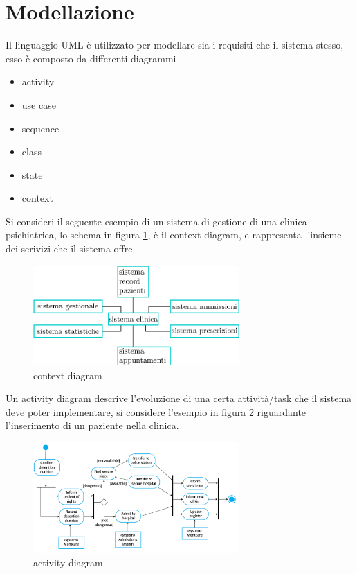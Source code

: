 \documentclass[10pt, letterpaper]{report}
\begin{document}
\section{Modellazione}
Il linguaggio UML è utilizzato per modellare sia i requisiti che il sistema stesso, 
esso è composto da differenti diagrammi\begin{itemize}
    \item activity 
    \item use case 
    \item sequence 
    \item class 
    \item state 
    \item context
\end{itemize}
Si consideri il seguente esempio di un sistema di gestione di una clinica psichiatrica, 
lo schema in figura \ref{clinica}, è il context diagram, e rappresenta l'insieme dei serivizi che il 
sistema offre.
\begin{figure}[h!]
    \centering 
    \includegraphics[width=0.7\textwidth ]{images/context.eps}
    \caption{context diagram}
    \label{clinica}
\end{figure}
Un activity diagram descrive l'evoluzione di una certa attività/task che il sistema 
deve poter implementare, si considere l'esempio in figura \ref{activity} riguardante 
l'inserimento di un paziente nella clinica.
\begin{figure}[h!]
    \centering 
    \includegraphics[width=0.7\textwidth ]{images/acrivity.png}
    \caption{activity diagram}
    \label{activity}
\end{figure}
\flowerLine 
\end{document}
